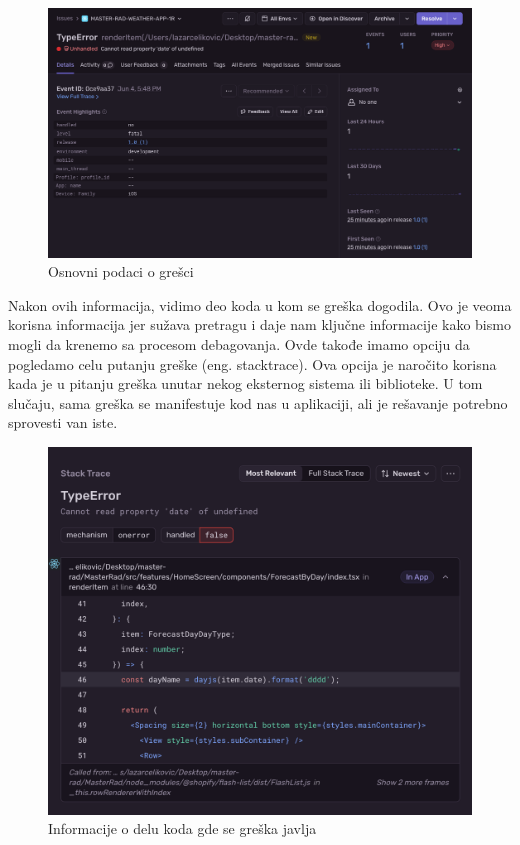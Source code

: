 \documentclass[12pt,oneside]{memoir}
\begin{document}
\begin{figure}[h!]
\centering
\includegraphics[scale=0.4]{docs/images/chapterSeven/sentryErrorBasicData.png}
\caption{Osnovni podaci o grešci}
\label{fig:sentryErrorBasicInfo}
\end{figure}

Nakon ovih informacija, vidimo deo koda u kom se greška dogodila. Ovo je veoma korisna informacija jer sužava pretragu i daje nam ključne informacije kako bismo mogli da krenemo sa procesom debagovanja. Ovde takođe imamo opciju da pogledamo celu putanju greške (eng. stacktrace). Ova opcija je naročito korisna kada je u pitanju greška unutar nekog eksternog sistema ili biblioteke. U tom slučaju, sama greška se manifestuje kod nas u aplikaciji, ali je rešavanje potrebno sprovesti van iste. 

\begin{figure}[h!]
\centering
\includegraphics[scale=0.4]{docs/images/chapterSeven/SentyErrorStacktrace.png}
\caption{Informacije o delu koda gde se greška javlja}
\label{fig:sentryStacktrace}
\end{figure}
\end{document}
